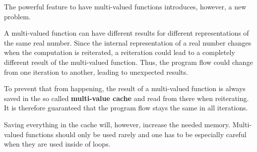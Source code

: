 		The powerful feature to have multi-valued functions introduces, however, a
    new problem.

		A multi-valued function can have different results for different representations of the same real number.
    Since the internal representation of a real number changes when the
    computation is reiterated, a reiteration could lead to a completely
    different result of the multi-valued function.
		Thus, the program flow could change from one iteration to another, leading to unexpected results.

		To prevent that from happening, the result of a multi-valued function is always saved in the so called \textbf{multi-value cache}
		and read from there when reiterating. 
		It is therefore guaranteed that the program flow stays the same in all iterations.
		
    Saving everything in the cache will, however, increase the needed memory.
    Multi-valued functions should only be used rarely and one has to be
    especially careful when they are used inside of loops.
